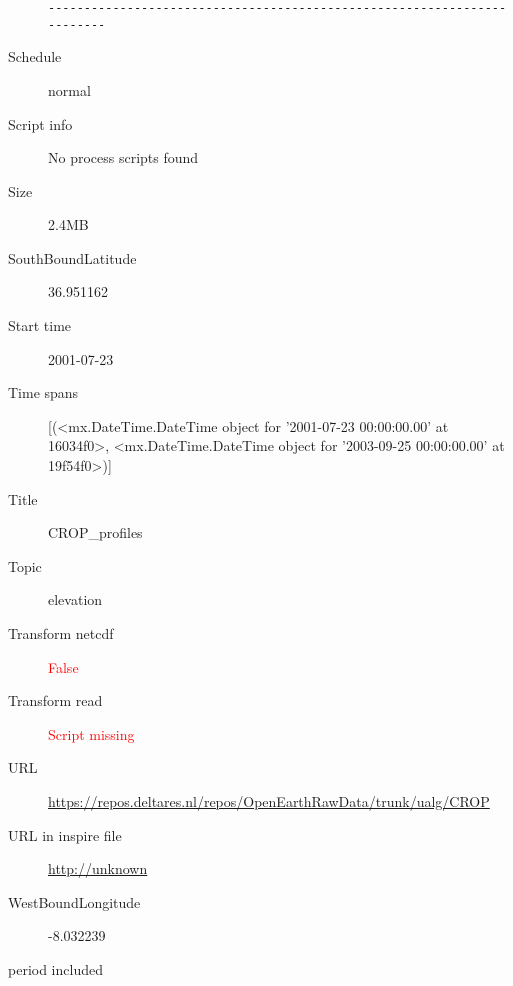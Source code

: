 \documentclass[9]{report}
\begin{document}
\begin{description}
\begin{verbatim}
------------------------------------------------------------------------

\end{verbatim}
  \item[Schedule] normal
  \item[Script info] No process scripts found
  \item[Size] 2.4MB
  \item[SouthBoundLatitude] 36.951162
  \item[Start time] 2001-07-23
  \item[Time spans] [(<mx.DateTime.DateTime object for '2001-07-23 00:00:00.00' at 16034f0>, <mx.DateTime.DateTime object for '2003-09-25 00:00:00.00' at 19f54f0>)]
  \item[Title]  CROP\_profiles 
  \item[Topic] elevation
  \item[Transform netcdf] \textcolor{red}{False}
  \item[Transform read] \textcolor{red}{Script missing}
  \item[URL] \href{https://repos.deltares.nl/repos/OpenEarthRawData/trunk/ualg/CROP}{https://repos.deltares.nl/repos/OpenEarthRawData/trunk/ualg/CROP}
  \item[URL in inspire file] \href{http://unknown}{http://unknown}
  \item[WestBoundLongitude] -8.032239
  \item[period included] 
\end{description}
\end{document}
